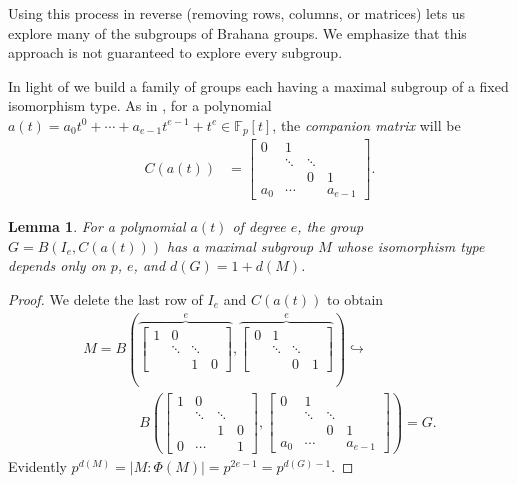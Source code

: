 \documentclass{toc}
\numberwithin{equation}{section}
\theoremstyle{plain}       %
\newtheorem{lem}[equation]{Lemma}
\theoremstyle{remark}
\theoremstyle{definition}
\numberwithin{figure}{section}
\numberwithin{table}{section}
\newcommand{\bbF}{\mathbb{F}}  %
\begin{document}
Using this process in reverse (removing rows, columns, or matrices) lets us
explore many of the subgroups of Brahana groups.  We emphasize that this
approach is not guaranteed to explore every subgroup.
\medskip

In light of  we build a family of groups each having a
maximal subgroup of a fixed isomorphism type.  As in \cite[p. 70]{JacII}, for a
polynomial $a(t)=a_0t^0+\cdots +a_{e-1}t^{e-1}+t^e\in \bbF_p[t]$, the
\emph{companion matrix} will be 
\begin{align*}
	C(a(t)) & = 	\begin{bmatrix}
		0 & 1 & \\
		 & \ddots & \ddots\\
		  & & 0 & 1\\
		a_0 & \cdots & & a_{e-1}
	\end{bmatrix}.
\end{align*}

\begin{lem}\label{lem:flat}
	For a polynomial $a(t)$ of degree $e$, the group $G=B(I_e,C(a(t)))$ has a
	maximal subgroup $M$ whose isomorphism type depends only on $p$, $e$, and
	$d(G)=1+d(M)$.
\end{lem}

\begin{proof} 
We delete the last row of $I_e$ and $C(a(t))$ to obtain
\begin{align*}
 	M=B\left(
	\overbrace{\begin{bmatrix}
		1 & 0  & \\
		 & \ddots & \ddots\\
		 & & 1 & 0
	\end{bmatrix}}^e,
	\overbrace{\begin{bmatrix}
		0 & 1 & \\
		 & \ddots & \ddots\\
		 & & 0 & 1
	\end{bmatrix}}^e
	\right)
	\hookrightarrow \qquad \qquad\\
	\qquad\qquad
 	B\left(\begin{bmatrix}
		1 & 0  & \\
		 & \ddots & \ddots \\
		 & & 1 & 0\\
		 \hline
		 0 &\cdots & & 1
	\end{bmatrix},
	\begin{bmatrix}
		0 & 1 & \\
		 & \ddots & \ddots\\
		  & & 0 & 1\\
		  \hline
		a_0 & \cdots & & a_{e-1}
	\end{bmatrix}
	\right)=G.
\end{align*}
Evidently $p^{d(M)}=|M:\Phi(M)|=p^{2e-1}=p^{d(G)-1}$.
\end{proof}
\end{document}
